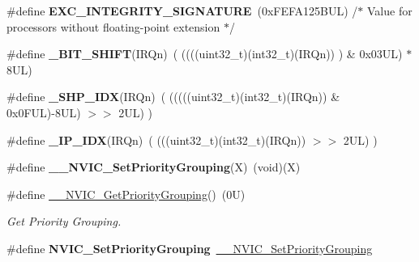 \begin{DoxyCompactItemize}
\mbox{\label{group___c_m_s_i_s___core___n_v_i_c_functions_ga7d1b21b2d863ccd9e23a3295b3173155}} 
\#define {\bfseries E\+X\+C\+\_\+\+I\+N\+T\+E\+G\+R\+I\+T\+Y\+\_\+\+S\+I\+G\+N\+A\+T\+U\+RE}~(0x\+F\+E\+F\+A125\+B\+U\+L)     /$\ast$ Value for processors without floating-\/point extension                $\ast$/
\item 
\mbox{\label{group___c_m_s_i_s___core___n_v_i_c_functions_ga53c75b28823441c6153269f0ecbed878}} 
\#define {\bfseries \+\_\+\+B\+I\+T\+\_\+\+S\+H\+I\+FT}(I\+R\+Qn)~(  ((((uint32\+\_\+t)(int32\+\_\+t)(I\+R\+Qn))         )      \&  0x03\+U\+L) $\ast$ 8\+U\+L)
\item 
\mbox{\label{group___c_m_s_i_s___core___n_v_i_c_functions_gaee4f7eb5d7e770ad51489dbceabb1755}} 
\#define {\bfseries \+\_\+\+S\+H\+P\+\_\+\+I\+DX}(I\+R\+Qn)~( (((((uint32\+\_\+t)(int32\+\_\+t)(I\+R\+Qn)) \& 0x0\+F\+U\+L)-\/8\+U\+L) $>$$>$    2\+U\+L)      )
\item 
\mbox{\label{group___c_m_s_i_s___core___n_v_i_c_functions_ga370ec4b1751a6a889d849747df3763a9}} 
\#define {\bfseries \+\_\+\+I\+P\+\_\+\+I\+DX}(I\+R\+Qn)~(   (((uint32\+\_\+t)(int32\+\_\+t)(I\+R\+Qn))                $>$$>$    2\+U\+L)      )
\item 
\mbox{\label{group___c_m_s_i_s___core___n_v_i_c_functions_ga6834dd8c9c59394f1b544b57665293a4}} 
\#define {\bfseries \+\_\+\+\_\+\+N\+V\+I\+C\+\_\+\+Set\+Priority\+Grouping}(X)~(void)(X)
\item 
\#define \mbox{\hyperlink{group___c_m_s_i_s___core___n_v_i_c_functions_gae1de06155d072758b3453edb07d12459}{\+\_\+\+\_\+\+N\+V\+I\+C\+\_\+\+Get\+Priority\+Grouping}}()~(0\+U)
\begin{DoxyCompactList}\small\item\em Get Priority Grouping. \end{DoxyCompactList}\item 
\mbox{\label{group___c_m_s_i_s___core___n_v_i_c_functions_ga0e798d5aec68cdd8263db86a76df788f}} 
\#define {\bfseries N\+V\+I\+C\+\_\+\+Set\+Priority\+Grouping}~\mbox{\hyperlink{group___c_m_s_i_s___core___n_v_i_c_functions_gafc94dcbaee03e4746ade1f5bb9aaa56d}{\+\_\+\+\_\+\+N\+V\+I\+C\+\_\+\+Set\+Priority\+Grouping}}

\end{DoxyCompactItemize}
